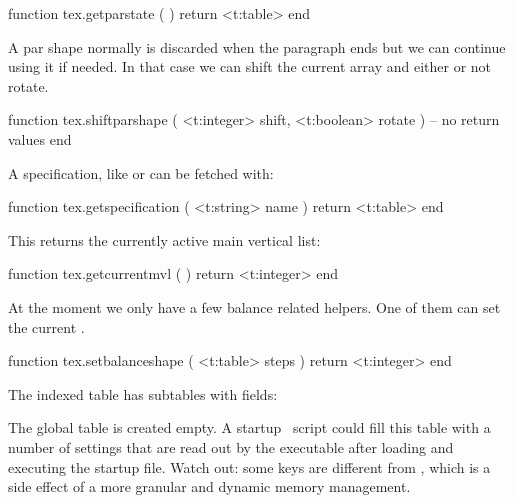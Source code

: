 \starttyping[option=LUA]
function tex.getparstate ( )
    return <t:table>
end
\stoptyping

A par shape normally is discarded when the paragraph ends but we can continue
using it if needed. In that case we can shift the current array and either
or not rotate.

\starttyping[option=LUA]
function tex.shiftparshape (
    <t:integer> shift,
    <t:boolean> rotate
)
    -- no return values
end
\stoptyping

A specification, like \type {\parshape} or \type {\widowpenalties} can be fetched
with:

\starttyping[option=LUA]
function tex.getspecification ( <t:string> name )
    return <t:table>
end
\stoptyping

\stopsubsection

\startsubsection[title=MVL]

This returns the currently active main vertical list:

\starttyping[option=LUA]
function tex.getcurrentmvl ( )
    return <t:integer>
end
\stoptyping

\stopsubsection

\startsubsection[title=Balancing]

At the moment we only have a few balance related helpers. One of them can set
the current .

\starttyping[option=LUA]
function tex.setbalanceshape (
    <t:table> steps
)
    return <t:integer>
end
\stoptyping

The indexed table has subtables with fields:

\starttabulate[|l|l|]
\NC {}      \NC {}         \NC \NR
\NC {}    \NC {}         \NC \NR
\NC {}      \NC {}          \NC \NR
\NC {}    \NC {} \NC \NR
\NC {} \NC {} \NC \NR
\NC {}      \NC {}          \NC \NR
\stoptabulate

\stopsubsection

\stopsection

\startsection[title={The configuration}]

The global  table is created empty. A startup \LUA\ script could
fill this table with a number of settings that are read out by the executable
after loading and executing the startup file. Watch out: some keys are different
from \LUATEX, which is a side effect of a more granular and dynamic memory
management.


